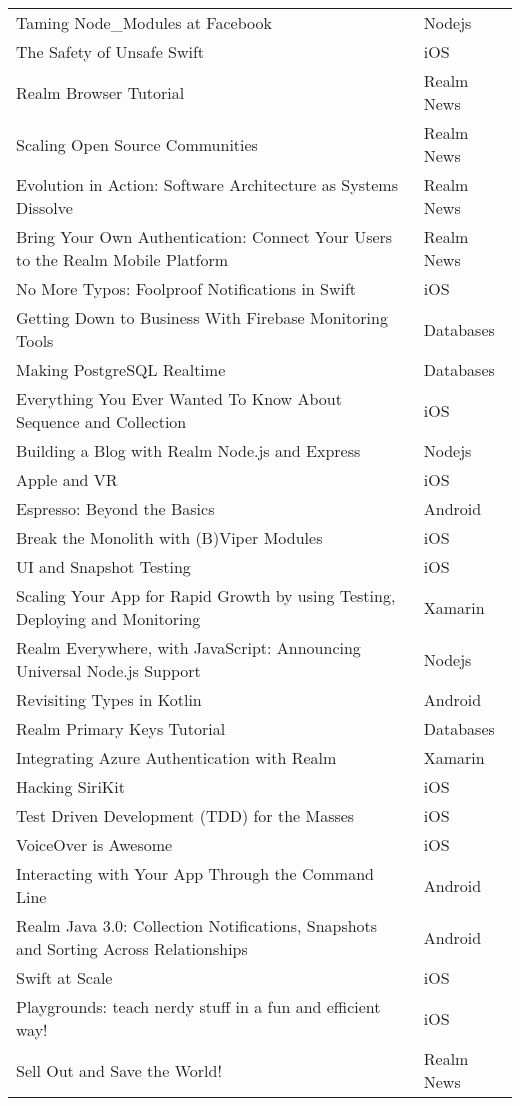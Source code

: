 \documentclass[letterpaper,11pt]{article}
\begin{document}
\begin{table}[h]
\begin{adjustbox}{max width=\linewidth}
\begin{tabular}{ | l | l |}
Taming Node\_Modules at Facebook & Nodejs \\ 
The Safety of Unsafe Swift & iOS \\ 
Realm Browser Tutorial & Realm News \\ 
Scaling Open Source Communities & Realm News \\ 
Evolution in Action: Software Architecture as Systems Dissolve & Realm News \\ 
Bring Your Own Authentication: Connect Your Users to the Realm Mobile Platform & Realm News \\ 
No More Typos: Foolproof Notifications in Swift & iOS \\ 
Getting Down to Business With Firebase Monitoring Tools & Databases \\ 
Making PostgreSQL Realtime & Databases \\ 
Everything You Ever Wanted To Know About Sequence and Collection & iOS \\ 
Building a Blog with Realm Node.js and Express & Nodejs \\ 
Apple and VR & iOS \\ 
Espresso: Beyond the Basics & Android  \\ 
Break the Monolith with (B)Viper Modules & iOS \\ 
UI and Snapshot Testing & iOS \\ 
Scaling Your App for Rapid Growth by using Testing, Deploying and Monitoring & Xamarin \\ 
Realm Everywhere, with JavaScript: Announcing Universal Node.js Support & Nodejs \\ 
Revisiting Types in Kotlin & Android \\ 
Realm Primary Keys Tutorial & Databases \\ 
Integrating Azure Authentication with Realm & Xamarin \\ 
Hacking SiriKit & iOS \\ 
Test Driven Development (TDD) for the Masses & iOS \\ 
VoiceOver is Awesome & iOS \\ 
Interacting with Your App Through the Command Line & Android \\ 
Realm Java 3.0: Collection Notifications, Snapshots and Sorting Across Relationships & Android \\ 
Swift at Scale & iOS \\ 
Playgrounds: teach nerdy stuff in a fun and efficient way! & iOS \\ 
Sell Out and Save the World! & Realm News \\ 

\end{tabular}
\end{adjustbox}
\end{table}
\end{document}
